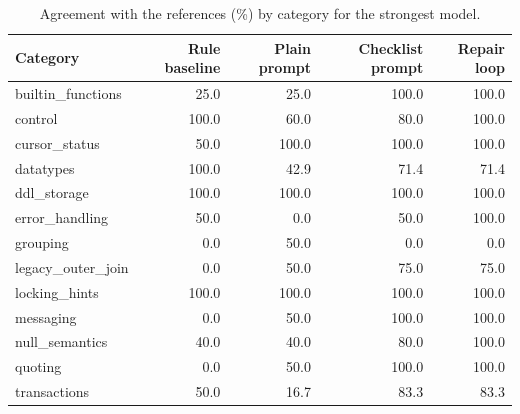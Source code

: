 \begin{table}[t]
\centering
\caption{Agreement with the references (\%) by category for the strongest model.}
\label{tab:category}
\footnotesize
\begin{tabular}{lrrrr}
\toprule
Category & Rule baseline & Plain prompt & Checklist prompt & Repair loop \\
\midrule
builtin\_functions & 25.0 & 25.0 & 100.0 & 100.0 \\
control & 100.0 & 60.0 & 80.0 & 100.0 \\
cursor\_status & 50.0 & 100.0 & 100.0 & 100.0 \\
datatypes & 100.0 & 42.9 & 71.4 & 71.4 \\
ddl\_storage & 100.0 & 100.0 & 100.0 & 100.0 \\
error\_handling & 50.0 & 0.0 & 50.0 & 100.0 \\
grouping & 0.0 & 50.0 & 0.0 & 0.0 \\
legacy\_outer\_join & 0.0 & 50.0 & 75.0 & 75.0 \\
locking\_hints & 100.0 & 100.0 & 100.0 & 100.0 \\
messaging & 0.0 & 50.0 & 100.0 & 100.0 \\
null\_semantics & 40.0 & 40.0 & 80.0 & 100.0 \\
quoting & 0.0 & 50.0 & 100.0 & 100.0 \\
transactions & 50.0 & 16.7 & 83.3 & 83.3 \\
\bottomrule
\end{tabular}
\end{table}
